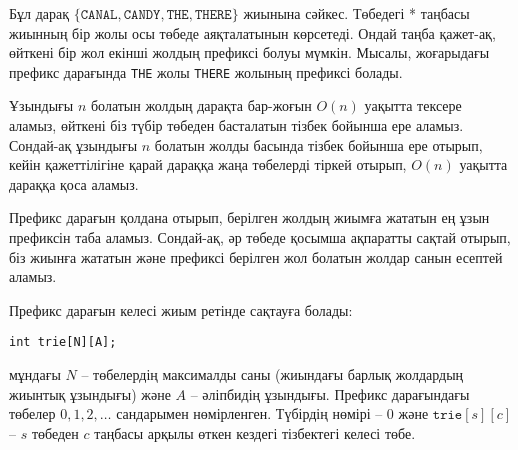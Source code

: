 Бұл дарақ 
$\{\texttt{CANAL},\texttt{CANDY},\texttt{THE},\texttt{THERE}\}$ жиынына
сәйкес. Төбедегі * таңбасы жиынның 
бір жолы осы төбеде аяқталатынын көрсетеді.
Ондай таңба қажет-ақ, өйткені бір жол екінші 
жолдың префиксі болуы мүмкін. Мысалы, жоғарыдағы 
префикс дарағында \texttt{THE} жолы \texttt{THERE} жолының
префиксі болады.


Ұзындығы $n$ болатын жолдың дарақта бар-жоғын
$O(n)$ уақытта тексере аламыз, өйткені біз
түбір төбеден басталатын тізбек бойынша ере аламыз.
Сондай-ақ ұзындығы $n$ болатын жолды 
басында тізбек бойынша ере отырып, кейін қажеттілігіне қарай дараққа жаңа төбелерді
тіркей отырып, $O(n)$ уақытта дараққа қоса аламыз. 



Префикс дарағын қолдана отырып, берілген жолдың жиымға жататын ең ұзын префиксін таба аламыз. 
Сондай-ақ, әр төбеде қосымша ақпаратты сақтай отырып, біз
жиынға жататын және префиксі берілген жол болатын 
жолдар санын есептей аламыз.


Префикс дарағын келесі жиым ретінде сақтауға болады:
\begin{lstlisting}
int trie[N][A];
\end{lstlisting}
мұндағы $N$ -- төбелердің максималды саны
(жиындағы барлық жолдардың жиынтық ұзындығы)
және $A$ -- әліпбидің ұзындығы.
Префикс дарағындағы төбелер
$0,1,2,\ldots$ сандарымен нөмірленген. Түбірдің нөмірі -- 0 және
$\texttt{trie}[s][c]$ -- $s$ төбеден $c$ таңбасы арқылы
өткен кездегі тізбектегі келесі төбе. 


